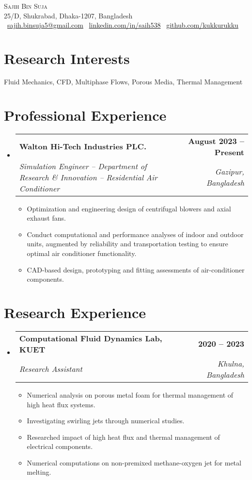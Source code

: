 \documentclass[letterpaper,11pt]{article}
\makeatletter
\newcommand{\resumeItem}[1]{
  \item\small{
    {#1 \vspace{-2pt}}
  }
}
\newcommand{\resumeSubheading}[4]{
  \vspace{-2pt}\item
    \begin{tabular*}{1.0\textwidth}[t]{l@{\extracolsep{\fill}}r}
      \textbf{#1} & \textbf{\small #2} \\
      \textit{\small#3} & \textit{\small #4} \\
    \end{tabular*}\vspace{-5pt}
}
\newcommand{\resumeSubHeadingListStart}{\begin{itemize}[leftmargin=0.0in, label={}]}
\newcommand{\resumeSubHeadingListEnd}{\end{itemize}}
\newcommand{\resumeItemListStart}{\begin{itemize}}
\newcommand{\resumeItemListEnd}{\end{itemize}\vspace{-5pt}}
\makeatother
\begin{document}
\begin{center}
    {\Huge \scshape Sajih Bin Suja} \\ \vspace{1pt}
    25/D, Shukrabad, Dhaka-1207, Bangladesh \\ \vspace{1pt}
    \small \textbar\ \href{mailto:sajih.binsuja5@gmail.com}{sajih.binsuja5@gmail.com} \hfill \textbar\ \href{https://linkedin.com/in/sajih538/}{linkedin.com/in/saih538} \hfill \textbar\ \href{https://github.com/kukkurukku}{github.com/kukkurukku}
    \vspace{-8pt}
\end{center}

\section{Research Interests}
{Fluid Mechanics, CFD, Multiphase Flows, Porous Media, Thermal Management}

\section{Professional Experience}
\resumeSubHeadingListStart
\resumeSubheading
{Walton Hi-Tech Industries PLC.}{August 2023 -- Present}
{Simulation Engineer -- Department of Research \& Innovation -- Residential Air Conditioner}{Gazipur, Bangladesh}
\resumeItemListStart
\resumeItem{Optimization and engineering design of centrifugal blowers and axial exhaust fans.}
\resumeItem{Conduct computational and performance analyses of indoor and outdoor units, augmented by reliability and transportation testing to ensure optimal air conditioner functionality.}
\resumeItem{CAD-based design, prototyping and fitting assessments of air-conditioner components. }
\resumeItemListEnd
\resumeSubHeadingListEnd
\vspace{-16pt}
\section{Research Experience}
\resumeSubHeadingListStart
\resumeSubheading
{Computational Fluid Dynamics Lab, KUET}{2020 -- 2023}
{Research Assistant}{Khulna, Bangladesh}
\resumeItemListStart
\resumeItem{Numerical analysis on porous metal foam for thermal management of high heat flux systems.}
\resumeItem{Investigating swirling jets through numerical studies.}
\resumeItem{Researched impact of high heat flux and thermal management of electrical components.}
\resumeItem{Numerical computations on non-premixed methane-oxygen jet for metal melting.}
\resumeItemListEnd
\resumeSubHeadingListEnd
\vspace{-16pt}
\end{document}
